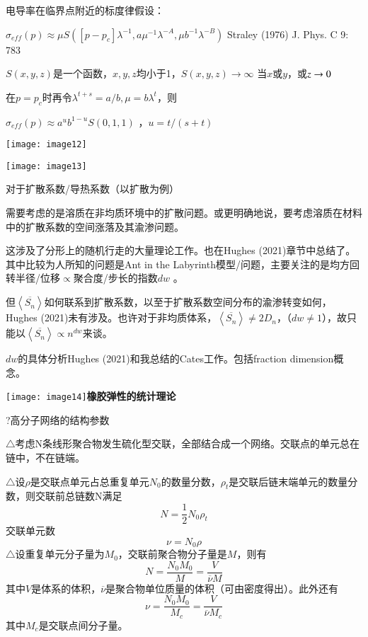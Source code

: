 \documentclass{article} %
\begin{document}
\noindent 电导率在临界点附近的标度律假设：

 $\sigma _{eff} \left(p\right)\approx \mu S\left(\left[p-p_{c} \right]\lambda ^{-1} ,a\mu ^{-1} \lambda ^{-A} ,\mu b^{-1} \lambda ^{-B} \right)$ Straley (1976) J. Phys. C 9: 783

\noindent $S\left(x,y,z\right)$是一个函数，$x,y,z$均小于1，$S(x,y,z)\to \infty $ 当$x$或$y$，或$z\to {\rm 0}$ 

\noindent 在$p=p_{c} $时再令$\lambda ^{t+s} =a/b,\mu =b\lambda ^{t} $，则

 $\sigma _{eff} (p)\approx a^{u} b^{1-u} S\left(0,1,1\right)$ ，$u=t/(s+t)$

\noindent \texttt{[image: image12]}

\noindent \texttt{[image: image13]}

\noindent 对于扩散系数/导热系数（以扩散为例）

\noindent 需要考虑的是溶质在非均质环境中的扩散问题。或更明确地说，要考虑溶质在材料中的扩散系数的空间涨落及其渝渗问题。

\noindent 这涉及了分形上的随机行走的大量理论工作。也在Hughes (2021)章节中总结了。其中比较为人所知的问题是Ant in the Labyrinth模型/问题，主要关注的是均方回转半径/位移$\propto $聚合度/步长的指数$dw$ 。

\noindent 但$\left\langle \overline{S_{n} }\right\rangle $如何联系到扩散系数，以至于扩散系数空间分布的渝渗转变如何，Hughes (2021)未有涉及。也许对于非均质体系，$\left\langle \overline{S_{n} }\right\rangle \ne 2D_{n} $，（$dw\ne 1$），故只能以$\left\langle \overline{S_{n} }\right\rangle \propto n^{dw} $来谈。

\noindent $dw$的具体分析Hughes (2021)和我总结的Cates工作。包括fraction dimension概念。

\noindent \eject 

\noindent \texttt{[image: image14]}\textbf{橡胶弹性的统计理论}

\noindent ?高分子网络的结构参数

\noindent $\mathrm{\triangle}$考虑N条线形聚合物发生硫化型交联，全部结合成一个网络。交联点的单元总在链中，不在链端。

\noindent $\mathrm{\triangle}$设$\rho $是交联点单元占总重复单元$N_{0} $的数量分数，$\rho _{t} $是交联后链末端单元的数量分数，则交联前总链数N满足
\[N=\frac{1}{2} N_{0} \rho _{t} \] 
交联单元数
\[\nu =N_{0} \rho \] 
$\mathrm{\triangle}$设重复单元分子量为$M_{0} $，交联前聚合物分子量是$M$，则有
\[N=\frac{N_{0} M_{0} }{M} =\frac{V}{\overline{\nu }M} \] 
其中$V$是体系的体积，$\overline{\nu }$是聚合物单位质量的体积（可由密度得出）。此外还有
\[\nu =\frac{N_{0} M_{0} }{M_{c} } =\frac{V}{\overline{\nu }M_{c} } \] 
其中$M_{c} $是交联点间分子量。
\end{document}
